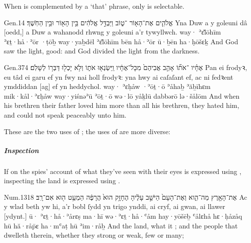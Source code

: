 
\begin{paper}
	{\click} When  is complemented by a  ‘that’ phrase, only  is selectable.
\end{paper}

\begin{example}{Gen.}{1}{4}{}{}
	\quoling
	{ אֱלֹהִ֛ים אֶת־הָא֖וֹר ־ט֑וֹב וַיַּבְדֵּ֣ל אֱלֹהִ֔ים בֵּ֥ין הָא֖וֹר וּבֵ֥ין הַחֹֽשֶׁךְ׃}
	{Yna Duw a  y goleuni  dâ [oedd,] a Duw a wahanodd rhwng y goleuni a’r tywyllwch.}
	{way· ʾɛ̆lōhīm ʾɛṯ·hå·ʾōr ·ṭōḇ way·yaḇdēl ʾɛ̆lōhīm bēn hå·ʾōr ū·ḇēn ha·ḥōšɛḵ}
	{And God saw the light,   good: and God divided the light from the darkness.}
\end{example}

\begin{example}{Gen.}{37}{4}{}{}
	\quoling
	{ אֶחָ֗יו ־אֹת֞וֹ אָהַ֤ב אֲבִיהֶם֙ מִכָּל־אֶחָ֔יו וַֽיִּשְׂנְא֖וּ אֹת֑וֹ וְלֹ֥א יָכְל֖וּ דַּבְּר֥וֹ לְשָׁלֹֽם׃}
	{Pan  ei frodyꝛ,  eu tâd  ei garu ef yn fwy nai holl frodyꝛ: yna hwy ai caſaſant ef, ac ni fedꝛent ymddiddan [ag] ef yn heddychol.}
	{way· ʾɛḥåw ·ʾōṯ·ō ʾåhaḇ ʾăḇīhɛm mik·kål·ʾɛḥåw way·yiśnəʾū ʾōṯ·ō wə·lō yåḵlū dabbərō lə·šålōm}
	{And when his brethren   their father loved him more than all his brethren, they hated him, and could not speak peaceably unto him.}
\end{example}

\begin{paper}
	{\click}{\click} These are the two uses of ; the uses of  are more diverse:
\end{paper}



\paragraph{}

\subparagraph{Inspection}

\begin{paper}
	If on  the spies’ account of what they’ve seen with their eyes is expressed using , inspecting the land is expressed using .
\end{paper}

\begin{example}{Num.}{13}{18}{}{}
	\quoling
	{ אֶת־הָאָ֖רֶץ מַה־הִ֑וא וְאֶת־הָעָם֙ הַיֹּשֵׁ֣ב עָלֶ֔יהָ הֶחָזָ֥ק הוּא֙ הֲרָפֶ֔ה הַמְעַ֥ט ה֖וּא אִם־רָֽב׃}
	{Ac  y wlad beth yw hi, a’r bobl ſydd yn trigo ynddi, ai cryf, ai gwan, ai llawer [ydynt.]}
	{ū· ʾɛṯ·hå·ʾårɛṣ ma·hī wə·ʾɛṯ·hå·ʿåm hay·yōšēḇ ʿålɛhå hɛ·ḥåzåq hū hă·råp̄ɛ ha·mʿaṭ hū ʾim·råḇ}
	{And  the land, what it ; and the people that dwelleth therein, whether they  strong or weak, few or many;}
\end{example}

